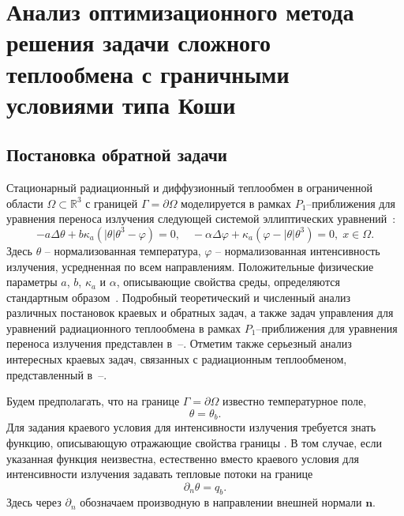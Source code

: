 \section{Анализ оптимизационного метода решения
задачи сложного теплообмена с граничными условиями типа
Коши}\label{sec:ch2/sec2}

\subsection{Постановка обратной задачи}\label{subsec:ch2/sec2/subsec1}

Стационарный радиационный и диффузионный теплообмен в
ограниченной области $\Omega\subset \mathbb{R}^3$ с границей
$\Gamma=\partial\Omega$ моделируется в рамках $P_1$--приближения для уравнения
переноса излучения следующей системой эллиптических
уравнений~\cite{Pinnau2007,AMC-13,Kovtanyuk2014a}:
\begin{equation}
    \label{eq1}
    - a\Delta\theta + b\kappa_a(|\theta|\theta^3- \varphi)=0,   \quad
    -\alpha \Delta \varphi + \kappa_a(\varphi-|\theta|\theta^3)=0,\; x\in\Omega.
\end{equation}
Здесь $\theta$ -- нормализованная температура, $\varphi$ --
нормализованная интенсивность излучения, усредненная по всем
направлениям.
Положительные физические параметры
$a$, $b$, $\kappa_a$ и $\alpha$, описывающие
свойства среды, определяются стандартным образом~\cite{Kovtanyuk2014a}.
Подробный теоретический и численный анализ различных постановок
краевых и обратных задач, а также задач управления
для уравнений радиационного теплообмена
в рамках $P_1$--приближения для уравнения
переноса излучения представлен в~\cite{Pinnau2007}--\cite{CMMP20}.
Отметим также серьезный анализ интересных краевых задач, связанных с радиационным теплообменом,
представленный в~\cite{Amosov05}--\cite{Amosov20}.

Будем предполагать, что на границе $\Gamma = \partial \Omega$ известно температурное поле,
\begin{equation}
    \label{bc1} \theta = \theta_b.
\end{equation}
Для задания краевого условия для интенсивности излучения
требуется знать функцию, описывающую отражающие свойства границы \cite{JVM-14}.
В том случае, если указанная функция неизвестна, естественно вместо
краевого условия для интенсивности излучения задавать тепловые потоки на границе
\begin{equation}
    \label{bc2} \partial_n\theta = q_b.
\end{equation}
Здесь через $\partial_n$ обозначаем производную в направлении
внешней нормали $\mathbf n$.

